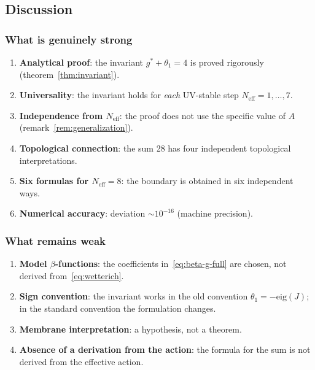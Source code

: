 \documentclass[11pt,a4paper]{article}
\theoremstyle{definition}
\begin{document}
\subsection{Discussion}
\label{subsec:frg-discussion}

\subsubsection{What is genuinely strong}

\begin{enumerate}
    \item \textbf{Analytical proof}: the invariant
          $g^* + \theta_1 = 4$ is proved rigorously (theorem~\ref{thm:invariant}).
    \item \textbf{Universality}: the invariant holds
          for \emph{each} UV-stable step
          $N_{\text{eff}} = 1, \ldots, 7$.
    \item \textbf{Independence from $N_{\text{eff}}$}: the proof
          does not use the specific value of $A$ (remark~\ref{rem:generalization}).
    \item \textbf{Topological connection}: the sum 28 has four
          independent topological interpretations.
    \item \textbf{Six formulas for $N_{\text{eff}} = 8$}: the boundary
          is obtained in six independent ways.
    \item \textbf{Numerical accuracy}: deviation
          $\sim 10^{-16}$ (machine precision).
\end{enumerate}

\subsubsection{What remains weak}

\begin{enumerate}
    \item \textbf{Model $\beta$-functions}: the coefficients in~\eqref{eq:beta-g-full}
          are chosen, not derived from~\eqref{eq:wetterich}.
    \item \textbf{Sign convention}: the invariant works
          in the old convention $\theta_1 = -\mathrm{eig}(J)$;
          in the standard convention the formulation changes.
    \item \textbf{Membrane interpretation}: a hypothesis, not a theorem.
    \item \textbf{Absence of a derivation from the action}: the formula
          for the sum is not derived from the effective action.
\end{enumerate}
\end{document}
